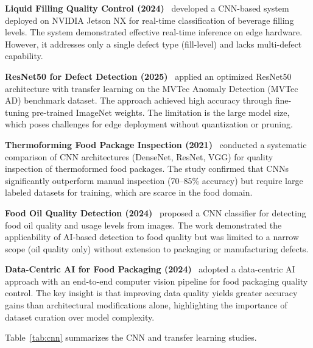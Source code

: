 \documentclass{ieeeaccess}
\begin{document}
\textbf{Liquid Filling Quality Control (2024)}~\cite{liquidfilling2024} developed a CNN-based system deployed on NVIDIA Jetson NX for real-time classification of beverage filling levels. The system demonstrated effective real-time inference on edge hardware. However, it addresses only a single defect type (fill-level) and lacks multi-defect capability.

\textbf{ResNet50 for Defect Detection (2025)}~\cite{resnet50defect2025} applied an optimized ResNet50 architecture with transfer learning on the MVTec Anomaly Detection (MVTec AD) benchmark dataset. The approach achieved high accuracy through fine-tuning pre-trained ImageNet weights. The limitation is the large model size, which poses challenges for edge deployment without quantization or pruning.

\textbf{Thermoforming Food Package Inspection (2021)}~\cite{thermoforming2021} conducted a systematic comparison of CNN architectures (DenseNet, ResNet, VGG) for quality inspection of thermoformed food packages. The study confirmed that CNNs significantly outperform manual inspection (70--85\% accuracy) but require large labeled datasets for training, which are scarce in the food domain.

\textbf{Food Oil Quality Detection (2024)}~\cite{foodoil2024} proposed a CNN classifier for detecting food oil quality and usage levels from images. The work demonstrated the applicability of AI-based detection to food quality but was limited to a narrow scope (oil quality only) without extension to packaging or manufacturing defects.

\textbf{Data-Centric AI for Food Packaging (2024)}~\cite{cvpackaging2024} adopted a data-centric AI approach with an end-to-end computer vision pipeline for food packaging quality control. The key insight is that improving data quality yields greater accuracy gains than architectural modifications alone, highlighting the importance of dataset curation over model complexity.

Table~\ref{tab:cnn} summarizes the CNN and transfer learning studies.
\end{document}
